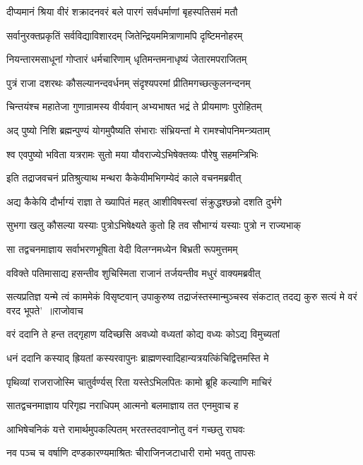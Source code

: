 \twolineshloka
{दीप्यमानं श्रिया वीरं शक्रादनवरं बले}
{पारगं सर्वधर्माणां बृहस्पतिसमं मतौ}


\twolineshloka
{सर्वानुरक्तप्रकृतिं सर्वविद्याविशारदम्}
{जितेन्द्रियममित्राणामपि दृष्टिमनोहरम्}


\twolineshloka
{नियन्तारमसाधूनां गोप्तारं धर्मचारिणाम्}
{धृतिमन्तमनाधृष्यं जेतारमपराजितम्}


\twolineshloka
{पुत्रं राजा दशरथः कौसल्यानन्दवर्धनम्}
{संदृश्यपरमां प्रीतिमगच्छत्कुलनन्दनम्}


\twolineshloka
{चिन्तयंश्च महातेजा गुणान्रामस्य वीर्यवान्}
{अभ्यभाषत भद्रं ते प्रीयमाणः पुरोहितम्}


\twolineshloka
{अद् पुष्यो निशि ब्रह्मन्पुण्यं योगमुपैष्यति}
{संभाराः संभ्रियन्तां मे रामश्चोपनिमन्त्र्यताम्}


\twolineshloka
{श्व एवपुष्यो भविता यत्ररामः सुतो मया}
{यौवराज्येऽभिषेक्तव्यः पौरेषु सहमन्त्रिभिः}


\twolineshloka
{इति तद्राजवचनं प्रतिश्रुत्याथ मन्थरा}
{कैकेयीमभिगम्येदं काले वचनमब्रवीत्}


\twolineshloka
{अद्य कैकेयि दौर्भाग्यं राज्ञा ते ख्यापितं महत्}
{आशीविषस्त्वां संक्रुद्धश्छन्नो दशति दुर्भगे}


\twolineshloka
{सुभगा खलु कौसल्या यस्याः पुत्रोऽभिषेक्ष्यते}
{कुतो हि तव सौभाग्यं यस्याः पुत्रो न राज्यभाक्}


\twolineshloka
{सा तद्वचनमाज्ञाय सर्वाभरणभूषिता}
{वेदी विलग्नमध्येन बिभ्रती रूपमुत्तमम्}


\twolineshloka
{वविक्ते पतिमासाद्य हसन्तीव शुचिस्मिता}
{राजानं तर्जयन्तीव मधुरं वाक्यमब्रवीत्}


\fourlineindentedshloka
{सत्यप्रतिज्ञ यन्मे त्वं काममेकं विसृष्टवान्}
{उपाकुरुष्व तद्राजंस्तस्मान्मुञ्चस्व संकटात्}
{तदद्य कुरु सत्यं मे वरं वरद भूपते' ॥राजोवाच}
{}


\twolineshloka
{वरं ददानि ते हन्त तद्गृहाण यदिच्छसि}
{अवध्यो वध्यतां कोद्य वध्यः कोऽद्य विमुच्यतां}


\twolineshloka
{धनं ददानि कस्याद् ह्रियतां कस्यरवापुनः}
{ब्राह्मणस्वादिहान्यत्रयत्किंचिद्वित्तमस्ति मे}


\twolineshloka
{पृथिव्यां राजराजोस्मि चातुर्वर्ण्यस् रिता}
{यस्तेऽभिलपितः कामो ब्रूहि कल्याणि माचिरं}


\twolineshloka
{सातद्वचनमाज्ञाय परिगृह्य नराधिपम्}
{आत्मनो बलमाज्ञाय तत एनमुवाच ह}


\twolineshloka
{आभिषेचनिकं यत्ते रामार्थमुपकल्पितम्}
{भरतस्तदवाप्नोतु वनं गच्छतु राघवः}


\twolineshloka
{नव पञ्च च वर्षाणि दण्डकारण्यमाश्रितः}
{चीराजिनजटाधारी रामो भवतु तापसः}


